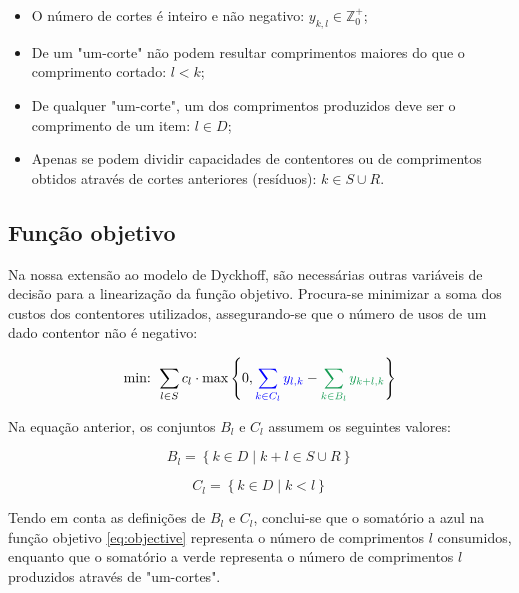 \documentclass[12pt, a4paper, titlepage]{article}
\begin{document}
\begin{itemize}
    \item O número de cortes é inteiro e não negativo: $y_{k, l} \in \mathbb{Z}^+_0$;
    \item De um "um-corte"{} não podem resultar comprimentos maiores do que o comprimento cortado:
        $l < k$;
    \item De qualquer "um-corte"{}, um dos comprimentos produzidos deve ser o comprimento de um
        item: $l \in D$;
    \item Apenas se podem dividir capacidades de contentores ou de comprimentos obtidos através de
        cortes anteriores (resíduos): $k \in S \cup R$.
\end{itemize}

\subsection{Função objetivo}

Na nossa extensão ao modelo de Dyckhoff, são necessárias outras variáveis de decisão para a
linearização da função objetivo. Procura-se minimizar a soma dos custos dos contentores utilizados,
assegurando-se que o número de usos de um dado contentor não é negativo:

\begin{equation}
    \text{min: } \sum_{l \in S} c_l \cdot \max \left \{ 0,
        {\color{blue} \sum_{k \in C_l} y_{l,k}} -
        {\color{ForestGreen} \sum_{k \in B_l} y_{k + l, k}}
    \right \}
    \label{eq:objective}
\end{equation}

Na equação anterior, os conjuntos $B_l$ e $C_l$ assumem os seguintes valores:

\begin{equation}
    B_l = \left \{k \in D \mid k + l \in S \cup R \right \} \label{eq:Bl}
\end{equation}

\begin{equation}
    C_l = \left \{k \in D \mid k < l \right \} \label{eq:Cl}
\end{equation}

Tendo em conta as definições de $B_l$ e $C_l$, conclui-se que o somatório a {\color{blue} azul}
na função objetivo \eqref{eq:objective} representa o número de comprimentos $l$ consumidos, enquanto
que o somatório a {\color{ForestGreen} verde} representa o número de comprimentos $l$ produzidos
através de "um-cortes"{}.
\end{document}
